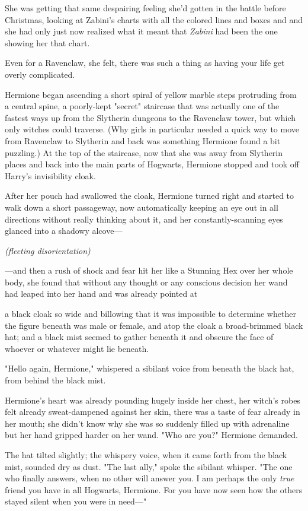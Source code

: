 She was getting that same despairing feeling she'd gotten in the battle before
Christmas, looking at Zabini's charts with all the colored lines and boxes
and{\el} and she had only just now realized what it meant that \emph{Zabini}
had been the one showing her that chart.

Even for a Ravenclaw, she felt, there was such a thing as having your life get
overly complicated.

Hermione began ascending a short spiral of yellow marble steps protruding from
a central spine, a poorly-kept "secret" staircase that was actually one of the
fastest ways up from the Slytherin dungeons to the Ravenclaw tower, but which
only witches could traverse. (Why girls in particular needed a quick way to
move from Ravenclaw to Slytherin and back was something Hermione found a bit
puzzling.) At the top of the staircase, now that she was away from Slytherin
places and back into the main parts of Hogwarts, Hermione stopped and took off
Harry's invisibility cloak.

After her pouch had swallowed the cloak, Hermione turned right and started to
walk down a short passageway, now automatically keeping an eye out in all
directions without really thinking about it, and her constantly-scanning eyes
glanced into a shadowy alcove—

\emph{(fleeting disorientation)}

—and then a rush of shock and fear hit her like a Stunning Hex over her whole
body, she found that without any thought or any conscious decision her wand had
leaped into her hand and was already pointed at{\el}

{\el} a black cloak so wide and billowing that it was impossible to determine
whether the figure beneath was male or female, and atop the cloak a
broad-brimmed black hat; and a black mist seemed to gather beneath it and
obscure the face of whoever or whatever might lie beneath.

"Hello again, Hermione," whispered a sibilant voice from beneath the black hat,
from behind the black mist.

Hermione's heart was already pounding hugely inside her chest, her witch's
robes felt already sweat-dampened against her skin, there was a taste of fear
already in her mouth; she didn't know why she was so suddenly filled up with
adrenaline but her hand gripped harder on her wand. "Who are you?" Hermione
demanded.

The hat tilted slightly; the whispery voice, when it came forth from the black
mist, sounded dry as dust. "The last ally," spoke the sibilant whisper. "The
one who finally answers, when no other will answer you. I am perhaps the only
\emph{true} friend you have in all Hogwarts, Hermione. For you have now seen
how the others stayed silent when you were in need—"

